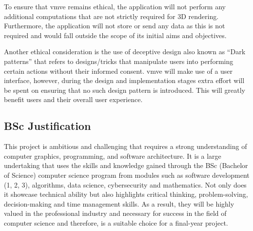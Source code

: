 \documentclass[11pt]{article}
\begin{document}
To ensure that \gls*{vmve} remains ethical, the application will not perform any
additional computations that are not strictly required for 3D rendering.
Furthermore, the application will not store or send any data as this is not
required and would fall outside the scope of its initial aims and objectives.

Another ethical consideration is the use of deceptive design also known as
``Dark patterns'' that refers to designs/tricks that manipulate users into
performing certain actions without their informed consent. \gls*{vmve} will make
use of a user interface, however, during the design and implementation stages
extra effort will be spent on ensuring that no such design pattern is
introduced. This will greatly benefit users and their overall user experience.

\subsection{BSc Justification}
This project is ambitious and challenging that requires a strong understanding
of computer graphics, programming, and software architecture. It is a large
undertaking that uses the skills and knowledge gained through the BSc (Bachelor
of Science) computer science program from modules such as software development
(1, 2, 3), algorithms, data science, cybersecurity and mathematics. Not only
does it showcase technical ability but also highlights critical thinking,
problem-solving, decision-making and time management skills. As a result, they
will be highly valued in the professional industry and necessary for success in
the field of computer science and therefore, is a suitable choice for a
final-year project.
\end{document}
